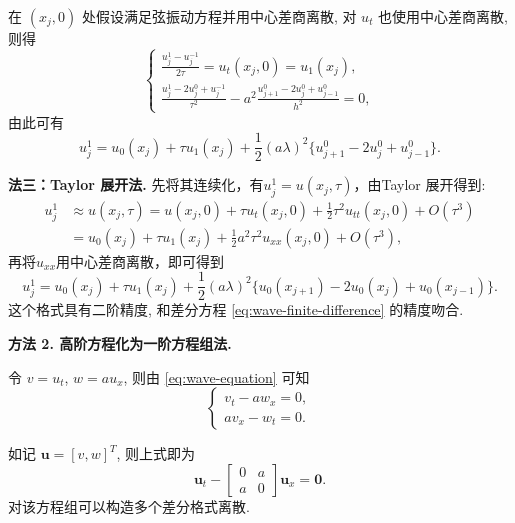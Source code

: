在 $(x_j, 0)$ 处假设满足弦振动方程并用中心差商离散, 对 $u_t$ 也使用中心差商离散, 则得
\begin{equation*}
    \begin{cases}
        \frac{u_j^1 - u_j^{-1}}{2\tau} = u_t(x_j, 0) = u_1(x_j), \\[2ex]
        \frac{u_j^1 - 2u_j^0 + u_j^{-1}}{\tau^2} - a^2 \frac{u_{j+1}^0 - 2u_j^0 + u_{j-1}^0}{h^2} = 0,
    \end{cases}
\end{equation*}
由此可有
\begin{equation*}
    u_j^1 = u_0(x_j) + \tau u_1(x_j) + \frac{1}{2}(a\lambda)^2 \{u_{j+1}^0 - 2u_j^0 + u_{j-1}^0 \}.
\end{equation*}

\noindent\textbf{法三：Taylor 展开法.} 先将其连续化，有$u_j^1=u(x_j,\tau)$，由Taylor 展开得到:
\begin{equation*}
    \begin{aligned}
        u_j^1 &\approx u(x_j, \tau) = u(x_j, 0) + \tau u_t(x_j, 0) + \frac{1}{2}\tau^2 u_{tt}(x_j, 0) + O(\tau^3) \\
        &= u_0(x_j) + \tau u_1(x_j) + \frac{1}{2}a^2\tau^2 u_{xx}(x_j, 0) + O(\tau^3),
    \end{aligned}
\end{equation*}
再将$u_{xx}$用中心差商离散，即可得到
\begin{equation*}
    u_j^1 = u_0(x_j) + \tau u_1(x_j) + \frac{1}{2}(a\lambda)^2 \{u_0(x_{j+1}) - 2u_0(x_j) + u_0(x_{j-1}) \}.
\end{equation*}
这个格式具有二阶精度, 和差分方程 \eqref{eq:wave-finite-difference} 的精度吻合.

\noindent\textbf{方法 2. 高阶方程化为一阶方程组法.}

令 $v = u_t$, $w = a u_x$, 则由 \eqref{eq:wave-equation} 可知
\begin{equation*}
    \begin{cases}
        v_t - a w_x = 0, \\
        a v_x - w_t = 0.
    \end{cases}
\end{equation*}

如记 $\boldsymbol{u} = [v, w]^T$, 则上式即为
\begin{equation*}
    \boldsymbol{u}_t -
    \begin{bmatrix}
        0 & a \\
        a & 0
    \end{bmatrix}
    \boldsymbol{u}_x = \boldsymbol{0}.
\end{equation*}
对该方程组可以构造多个差分格式离散.




